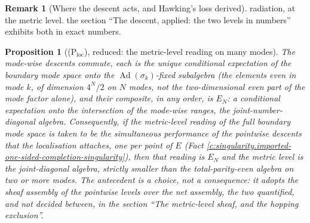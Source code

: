 \documentclass[11pt]{article}
\newtheorem{proposition}[theorem]{Proposition}
\theoremstyle{definition}
\newtheorem{remark}[theorem]{Remark}
\theoremstyle{plain}
\newcommand{\changedmark}[2]{\marginpar{\raggedright\scriptsize\color{#1}#2}}
\providecommand{\EN}{}\renewcommand{\EN}{E_{N}}
\begin{document}
\begin{remark}[Where the descent acts, and Hawking's loss derived]
radiation, at the metric level. the section ``The descent, applied: the two levels in numbers'' exhibits both in exact numbers.
\end{remark}

\begin{proposition}[(P$_{\mathrm{loc}}$), reduced: the metric-level reading on many modes]\label{c:singularity.p-reduced-metric-level-reading-many}
\changedmark{gray}{reworded}
The mode-wise descents commute, each is the unique conditional expectation of the boundary mode space onto the $\operatorname{Ad}(\sigma_k)$-fixed subalgebra (the elements even in mode $k$, of dimension $4^{N}/2$ on $N$ modes, not the two-dimensional even part of the mode factor alone), and their composite, in any order, is $\EN$: a conditional expectation onto the intersection of the mode-wise ranges, the joint-number-diagonal algebra. Consequently, if the metric-level reading of the full boundary mode space is taken to be the simultaneous performance of the pointwise descents that the localisation attaches, one per point of $E$ (Fact \ref{c:singularity.imported-one-sided-completion-singularity}), then that reading is $\EN$ and the metric level is the joint-diagonal algebra, strictly smaller than the total-parity-even algebra on two or more modes. The antecedent is a \emph{choice}, not a consequence: it adopts the sheaf assembly of the pointwise levels over the net assembly, the two quantified, and not decided between, in the section ``The metric-level sheaf, and the hopping exclusion''.
\end{proposition}
\end{document}
